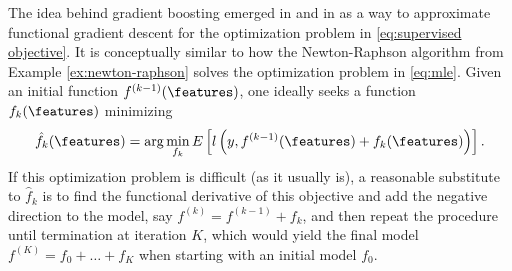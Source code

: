 The idea behind gradient boosting emerged in \citet{friedman2001greedy} and in \citet{mason1999boosting} as a way to approximate functional gradient descent for the optimization problem in \eqref{eq:supervised objective}. It is conceptually similar to how the Newton-Raphson algorithm from Example \ref{ex:newton-raphson} solves the optimization problem in \eqref{eq:mle}.
Given an initial function $f^{(k-1)}(\features)$, one ideally seeks a function $f_k(\features)$ minimizing
\begin{align}
	\hat{f}_k(\features) = \arg\min_{f_k} E\left[ l\left(y,f^{(k-1)}(\features)+f_k(\features)\right) \right].
\end{align}
If this optimization problem is difficult (as it usually is), a reasonable substitute to $\hat{f}_k$ is to find the functional derivative of this objective and add the negative direction to the model, say $f^{(k)} = f^{(k-1)} + f_k$, and then repeat the procedure until termination at iteration $K$, which would yield the final model $f^{(K)}=f_0+\dots+f_K$ when starting with an initial model $f_0$.

